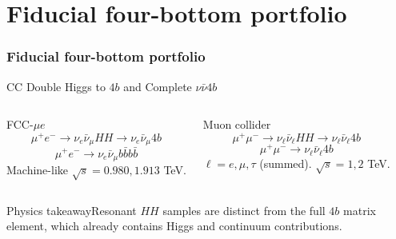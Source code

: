 \documentclass[aspectratio=1610,english]{beamer}
\newcommand{\src}[1]{\vfill{\par\color{black!65}\fontsize{6.4}{7.4}\selectfont\emph{Source:} #1\par}}
\newcommand{\key}[1]{\begin{alertblock}{Physics takeaway}\scriptsize #1\end{alertblock}}
\begin{document}
\part{Fiducial four-bottom portfolio}
\section{Fiducial four-bottom portfolio}







\begin{frame}[t]{CC Double Higgs to $4b$ and Complete $\nu\bar\nu4b$}
\small

\begin{columns}%
\begin{block}{FCC-$\mu e$}
\[\mu^+e^-\to\nu_e\bar\nu_\mu HH\to\nu_e\bar\nu_\mu4b\]
\[\mu^+e^-\to\nu_e\bar\nu_\mu b\bar bb\bar b\]
Machine-like $\sqrt{s}=0.980,1.913$ TeV.
\end{block}
\begin{block}{Muon collider}
\[\mu^+\mu^-\to\nu_\ell\bar\nu_\ell HH\to\nu_\ell\bar\nu_\ell4b\]
\[\mu^+\mu^-\to\nu_\ell\bar\nu_\ell4b\]
$\ell=e,\mu,\tau$ (summed). $\sqrt{s}=1,2$ TeV.
\end{block}
\end{columns}
\key{Resonant $HH$ samples are distinct from the full $4b$ matrix element, which already contains Higgs and continuum contributions.}

\end{frame}
\end{document}
